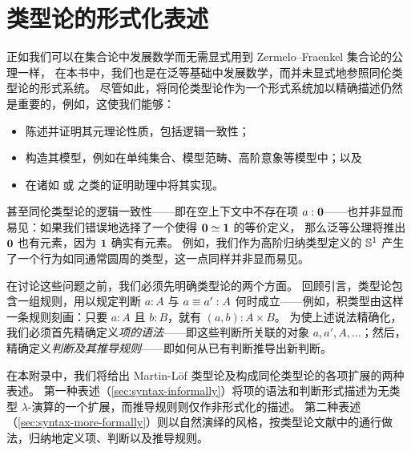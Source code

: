
\chapter{类型论的形式化表述}
\label{cha:rules}

%
%
%

正如我们可以在集合论中发展数学而无需显式用到 Zermelo--Fraenkel 集合论的公理一样，
在本书中，我们也是在泛等基础中发展数学，而并未显式地参照同伦类型论的形式系统。
尽管如此，将同伦类型论作为一个形式系统加以精确描述仍然是重要的，例如，这使我们能够：
%

\begin{itemize}
\item 陈述并证明其元理论性质，包括逻辑一致性；
\item 构造其模型，例如在单纯集合、模型范畴、高阶意象等模型中；以及
\item 在诸如 \Coq 或 \Agda 之类的证明助理中将其实现。
\end{itemize}

%
甚至同伦类型论的逻辑一致性——即在空上下文中不存在项 $a:\mathbf{0}$——也并非显而易见：如果我们错误地选择了一个使得 $\mathbf{0} \simeq \mathbf{1}$ 的等价定义，
那么泛等公理将推出 $\mathbf{0}$ 也有元素，因为 $\mathbf{1}$ 确实有元素。
例如，我们作为高阶归纳类型定义的 $\mathbb{S}^1$ 产生了一个行为如同通常圆周的类型，这一点同样并非显而易见。

在讨论这些问题之前，我们必须先明确类型论的两个方面。
回顾引言，类型论包含一组规则，用以规定判断 $a:A$ 与 $a\equiv a':A$ 何时成立——例如，积类型由这样一条规则刻画：只要 $a:A$ 且 $b:B$，就有 $(a,b):A\times B$。
为使上述说法精确化，我们必须首先精确定义\emph{项的语法}——即这些判断所关联的对象 $a,a',A,\dots$；然后，精确定义\emph{判断及其推导规则}——即如何从已有判断推导出新判断。

在本附录中，我们将给出 Martin-L\"{o}f 类型论及构成同伦类型论的各项扩展的两种表述。
第一种表述（\cref{sec:syntax-informally}）将项的语法和判断形式描述为无类型 $\lambda$-演算的一个扩展，而推导规则则仅作非形式化的描述。
第二种表述（\cref{sec:syntax-more-formally}）则以自然演绎的风格，按类型论文献中的通行做法，归纳地定义项、判断以及推导规则。

